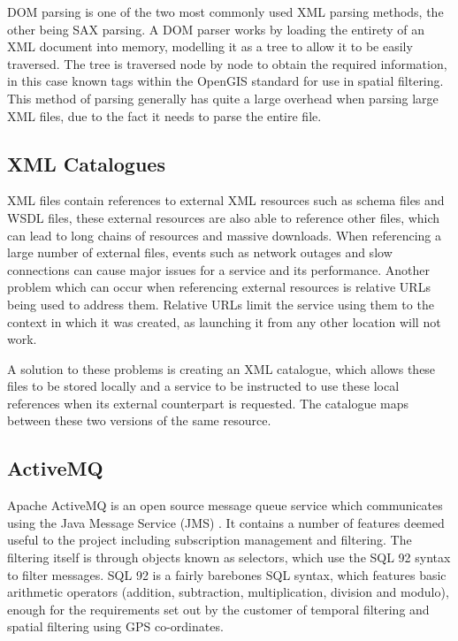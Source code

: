 \documentclass[a4paper, 12pt, twoside]{article}
\begin{document}
DOM parsing is one of the two most commonly used XML parsing methods, the other being SAX parsing. A DOM parser works by loading the entirety of an XML document into memory, modelling it as a tree to allow it to be easily traversed. The tree is traversed node by node to obtain the required information, in this case known tags within the OpenGIS standard for use in spatial filtering. This method of parsing generally has quite a large overhead when parsing large XML files, due to the fact it needs to parse the entire file.

\subsection{XML Catalogues}
\label{sec:bg_catalogues}

XML files contain references to external XML resources such as schema files and WSDL files, these external resources are also able to reference other files, which can lead to long chains of resources and massive downloads. When referencing a large number of external files, events such as network outages and slow connections can cause major issues for a service and its performance. Another problem which can occur when referencing external resources is relative URLs being used to address them. Relative URLs limit the service using them to the context in which it was created, as launching it from any other location will not work.

A solution to these problems is creating an XML catalogue, which allows these files to be stored locally and a service to be instructed to use these local references when its external counterpart is requested. The catalogue maps between these two versions of the same resource.

\subsection{ActiveMQ}
\label{sec:bg_activemq}

Apache ActiveMQ is an open source message queue service which communicates using the Java Message Service (JMS) \cite{activeMQ}. It contains a number of features deemed useful to the project including subscription management and filtering. The filtering itself is through objects known as selectors, which use the SQL 92 syntax to filter messages. SQL 92 is a fairly barebones SQL syntax, which features basic arithmetic operators (addition, subtraction, multiplication, division and modulo), enough for the requirements set out by the customer of temporal filtering and spatial filtering using GPS co-ordinates.
\end{document}
